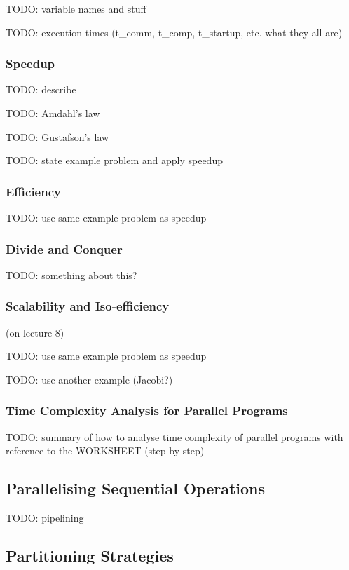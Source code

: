 \documentclass{article}
\begin{document}
TODO: variable names and stuff

TODO: execution times (t\_comm, t\_comp, t\_startup, etc. what they all are)

\subsubsection{Speedup}

TODO: describe

TODO: Amdahl's law

TODO: Gustafson's law

TODO: state example problem and apply speedup

\subsubsection{Efficiency}

TODO: use same example problem as speedup

\subsubsection{Divide and Conquer}

TODO: something about this?

\subsubsection{Scalability and Iso-efficiency}

(on lecture 8)

TODO: use same example problem as speedup

TODO: use another example (Jacobi?)

\subsubsection{Time Complexity Analysis for Parallel Programs}

TODO: summary of how to analyse time complexity of parallel programs with reference to the WORKSHEET (step-by-step)

\subsection{Parallelising Sequential Operations}

TODO: pipelining

\subsection{Partitioning Strategies}
\end{document}

